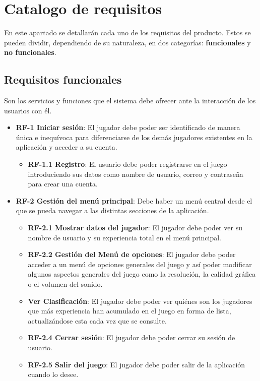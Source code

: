 \section{Catalogo de requisitos}
En este apartado se detallarán cada uno de los requisitos del producto. Estos se pueden dividir, dependiendo de su naturaleza, en dos categorías: \textbf{funcionales} y \textbf{no funcionales}.

\subsection{Requisitos funcionales}
Son los servicios y funciones que el sistema debe ofrecer ante la interacción de los usuarios con él.
\begin{itemize}
    \item \textbf{RF-1 Iniciar sesión}: El jugador debe poder ser identificado de manera única e inequívoca para diferenciarse de los demás jugadores existentes en la aplicación y acceder a su cuenta.
    \begin{itemize}
        \item \textbf{RF-1.1 Registro}: El usuario debe poder registrarse en el juego introduciendo sus datos como nombre de usuario, correo y contraseña para crear una cuenta.
    \end{itemize}
    \item \textbf{RF-2 Gestión del menú principal}: Debe haber un menú central desde el que se pueda navegar a las distintas secciones de la aplicación.
    \begin{itemize}
        \item \textbf{RF-2.1 Mostrar datos del jugador}: El jugador debe poder ver su nombre de usuario y su experiencia total en el menú principal.
        \item \textbf{RF-2.2 Gestión del Menú de opciones}: El jugador debe poder acceder a un menú de opciones generales del juego y así poder modificar algunos aspectos generales del juego como la resolución, la calidad gráfica o el volumen del sonido.
        \item \textbf{Ver Clasificación}: El jugador debe poder ver quiénes son los jugadores que más experiencia han acumulado en el juego en forma de lista, actualizándose esta cada vez que se consulte.
        \item \textbf{RF-2.4 Cerrar sesión}: El jugador debe poder cerrar su sesión de usuario.
        \item \textbf{RF-2.5 Salir del juego}: El jugador debe poder salir de la aplicación cuando lo desee.

\end{itemize}
\end{itemize}
